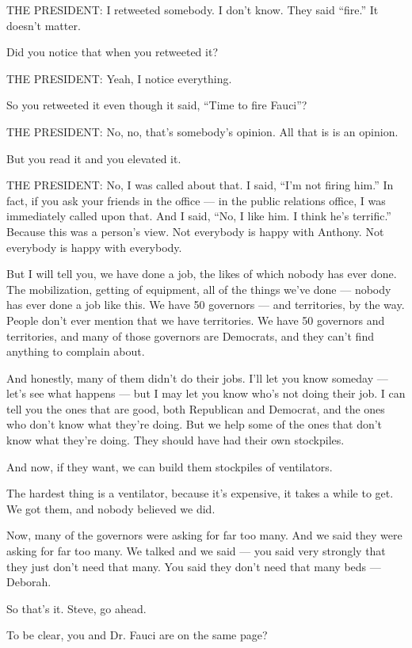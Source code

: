 THE PRESIDENT: I retweeted somebody. I don't know. They said ``fire.''
It doesn't matter.

Did you notice that when you retweeted it?

THE PRESIDENT: Yeah, I notice everything.

So you retweeted it even though it said, ``Time to fire Fauci''?

THE PRESIDENT: No, no, that's somebody's opinion. All that is is an
opinion.

But you read it and you elevated it.

THE PRESIDENT: No, I was called about that. I said, ``I'm not firing
him.'' In fact, if you ask your friends in the office --- in the public
relations office, I was immediately called upon that. And I said, ``No,
I like him. I think he's terrific.'' Because this was a person's view.
Not everybody is happy with Anthony. Not everybody is happy with
everybody.

But I will tell you, we have done a job, the likes of which nobody has
ever done. The mobilization, getting of equipment, all of the things
we've done --- nobody has ever done a job like this. We have 50
governors --- and territories, by the way. People don't ever mention
that we have territories. We have 50 governors and territories, and many
of those governors are Democrats, and they can't find anything to
complain about.

And honestly, many of them didn't do their jobs. I'll let you know
someday --- let's see what happens --- but I may let you know who's not
doing their job. I can tell you the ones that are good, both Republican
and Democrat, and the ones who don't know what they're doing. But we
help some of the ones that don't know what they're doing. They should
have had their own stockpiles.

And now, if they want, we can build them stockpiles of ventilators.

The hardest thing is a ventilator, because it's expensive, it takes a
while to get. We got them, and nobody believed we did.

Now, many of the governors were asking for far too many. And we said
they were asking for far too many. We talked and we said --- you said
very strongly that they just don't need that many. You said they don't
need that many beds --- Deborah.

So that's it. Steve, go ahead.

To be clear, you and Dr. Fauci are on the same page?


